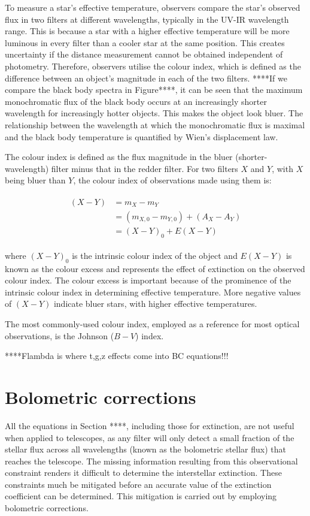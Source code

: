 \documentclass[12pt, a4paper]{report}
\begin{document}
To measure a star's effective temperature, observers compare the star's observed flux in two filters at different wavelengths, typically in the UV-IR wavelength range. This is because a star with a higher effective temperature will be more luminous in every filter than a cooler star at the same position. This creates uncertainty if the distance measurement cannot be obtained independent of photometry. Therefore, observers utilise the colour index, which is defined as the difference between an object's magnitude in each of the two filters. ****If we compare the black body spectra in Figure****, it can be seen that the maximum monochromatic flux of the black body occurs at an increasingly shorter wavelength for increasingly hotter objects. This makes the object look bluer. The relationship between the wavelength at which the monochromatic flux is maximal and the black body temperature is quantified by Wien's displacement law.

The colour index is defined as the flux magnitude in the bluer (shorter-wavelength) filter minus that in the redder filter. For two filters $X$ and $Y$, with $X$ being bluer than $Y$, the colour index of observations made using them is:

\begin{align}
\begin{split}
(X-Y) &= m_{X} - m_{Y} \\
&= (m_{X,0} - m_{Y,0}) + (A_{X} - A_{Y}) \\
&= (X-Y)_{0} + E(X-Y)
\end{split}
\end{align}

where $(X-Y)_{0}$ is the intrinsic colour index of the object and $E(X-Y)$ is known as the colour excess and represents the effect of extinction on the observed colour index. The colour excess is important because of the prominence of the intrinsic colour index in determining effective temperature. More negative values of $(X-Y)$ indicate bluer stars, with higher effective temperatures.

The most commonly-used colour index, employed as a reference for most optical observations, is the Johnson ($B-V$) index.

****Flambda is where t,g,z effects come into BC equations!!!

\section{Bolometric corrections} \label{BC_theory}
All the equations in Section ****, including those for extinction, are not useful when applied to telescopes, as any filter will only detect a small fraction of the stellar flux across all wavelengths (known as the bolometric stellar flux) that reaches the telescope. The missing information resulting from this observational constraint renders it difficult to determine the interstellar extinction. These constraints much be mitigated before an accurate value of the extinction coefficient can be determined. This mitigation is carried out by employing bolometric corrections.
\end{document}
